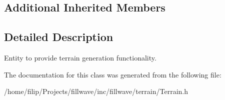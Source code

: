 \subsection*{Additional Inherited Members}


\subsection{Detailed Description}
Entity to provide terrain generation functionality. 

The documentation for this class was generated from the following file\+:\begin{DoxyCompactItemize}
\item 
/home/filip/\+Projects/fillwave/inc/fillwave/terrain/Terrain.\+h\end{DoxyCompactItemize}
